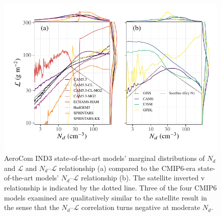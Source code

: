 \documentclass[acp, manuscript]{copernicus}\usepackage[]{graphicx}\usepackage[]{xcolor}
\newenvironment{knitrout}{}{} %
\newcommand\nd{\ensuremath{N_d}}
\newcommand\lwp{\ensuremath{\mathcal L}}
\begin{document}
\begin{figure}[t]
  \centering


\begin{knitrout}
\color{fgcolor}

{\centering \includegraphics[width=12cm]{figure/multimodel-pd-plot-print-1} 

}


\end{knitrout}
  \caption{AeroCom IND3 state-of-the-art models' marginal distributions of \nd{} and
    \lwp{} and \nd--\lwp{} relationship (a) compared
    to the CMIP6-era state-of-the-art models' \nd--\lwp{} relationship (b).  The
    satellite inverted v relationship \citep{Gryspeerdt2019} is indicated by
    the dotted line.  Three of the four CMIP6 models examined are qualitatively
    similar to the satellite result in the sense that the \nd--\lwp{}
    correlation turns negative at moderate \nd{}.}
  \label{fig:aerocom-cms-line-plot}
\end{figure}
%
\clearpage
%
\end{document}
